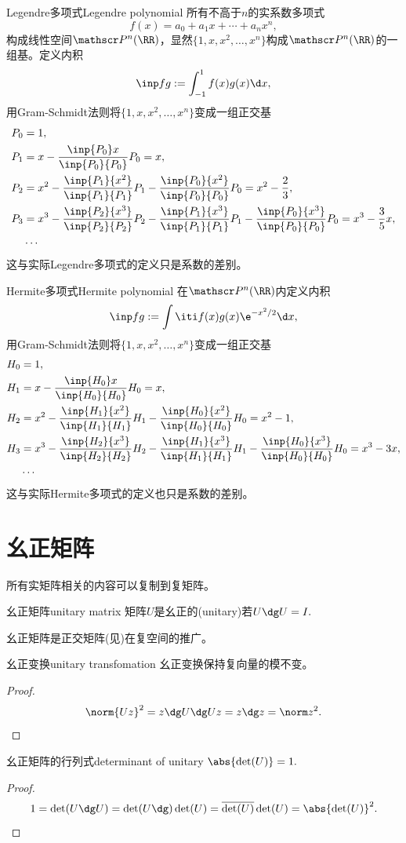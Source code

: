 \begin{example}{Legendre多项式}{Legendre polynomial}
	所有不高于$n$的实系数多项式
	\[
		f(x)=a_0+a_1x+\cdots+a_nx^n,
	\]
	构成线性空间$\mathscr P^n(\RR)$，显然$\{1,x,x^2,\ldots,x^n\}$构成$\mathscr P^n(\RR)$的一组基。定义内积
	\[
		\inp fg:=\int_{-1}^1f(x)g(x)\d x,
	\]
	用Gram-Schmidt法则将$\{1,x,x^2,\ldots,x^n\}$变成一组正交基%
	\begin{align*}
		P_0&=1,\\
		P_1&=x-\frac{\inp{P_0}x}{\inp{P_0}{P_0}}P_0=x,\\
		P_2&=x^2-\frac{\inp{P_1}{x^2}}{\inp{P_1}{P_1}}P_1-\frac{\inp{P_0}{x^2}}{\inp{P_0}{P_0}}P_0=x^2-\frac23,\\
		P_3&=x^3-\frac{\inp{P_2}{x^3}}{\inp{P_2}{P_2}}P_2-\frac{\inp{P_1}{x^3}}{\inp{P_1}{P_1}}P_1-\frac{\inp{P_0}{x^3}}{\inp{P_0}{P_0}}P_0=x^3-\frac35x,\\
		&\cdots
	\end{align*}
	这与实际Legendre多项式的定义只是系数的差别。
\end{example}
\begin{example}{Hermite多项式}{Hermite polynomial}
	在$\mathscr P^n(\RR)$内定义内积
	\[
		\inp fg:=\int\iti f(x)g(x)\e^{-x^2/2}\d x,
	\]
	用Gram-Schmidt法则将$\{1,x,x^2,\ldots,x^n\}$变成一组正交基
	\begin{align*}
		H_0&=1,\\
		H_1&=x-\frac{\inp{H_0}x}{\inp{H_0}{H_0}}H_0=x,\\
		H_2&=x^2-\frac{\inp{H_1}{x^2}}{\inp{H_1}{H_1}}H_1-\frac{\inp{H_0}{x^2}}{\inp{H_0}{H_0}}H_0=x^2-1,\\
		H_3&=x^3-\frac{\inp{H_2}{x^3}}{\inp{H_2}{H_2}}H_2-\frac{\inp{H_1}{x^3}}{\inp{H_1}{H_1}}H_1-\frac{\inp{H_0}{x^3}}{\inp{H_0}{H_0}}H_0=x^3-3x,\\
		&\cdots
	\end{align*}
	这与实际Hermite多项式的定义也只是系数的差别。
\end{example}

\section{幺正矩阵}

所有实矩阵相关的内容可以复制到复矩阵。

\begin{definition}{幺正矩阵}{unitary matrix}
	矩阵$U$是幺正的(unitary)若$U\dg U=I.$
\end{definition}
幺正矩阵是正交矩阵(见)在复空间的推广。
\begin{theorem}{幺正变换}{unitary transfomation}
	幺正变换保持复向量的模不变。
\end{theorem}
\begin{proof}
	\[
		\norm{Uz}^2=z\dg U\dg Uz=z\dg z=\norm z^2.
		\qedhere
	\]
\end{proof}
\begin{theorem}{幺正矩阵的行列式}{determinant of unitary}
	$\abs{\det(U)}=1.$
\end{theorem}
\begin{proof}
	\[
		1=\det(U\dg U)=\det(U\dg)\det(U)=\overline{\det(U)}\det(U)=\abs{\det(U)}^2.
		\qedhere
	\]
\end{proof}

